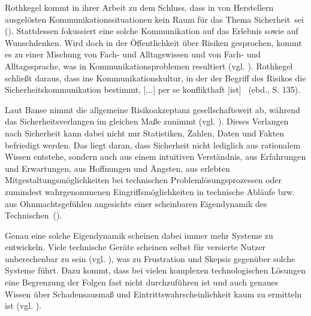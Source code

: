 Rothkegel kommt in ihrer Arbeit zu dem Schluss, dass in von Herstellern ausgelösten Kommunikationssituationen \glqq kein Raum für das Thema Sicherheit\grqq \, sei (\cite[132]{rothkegel2013sicherheitskommunikation}). Stattdessen fokussiert eine solche Kommunikation auf das Erlebnis sowie auf Wunschdenken. Wird doch in der Öffentlichkeit über Risiken gesprochen, kommt es zu einer Mischung von Fach- und Alltagswissen und von Fach- und Alltagssprache, was in Kommunikationsproblemen resultiert (vgl. \cite[134]{rothkegel2013sicherheitskommunikation}). Rothkegel schließt daraus, dass \glqq [e]ine Kommunikationskultur, in der der Begriff des Risikos die Sicherheitskommunikation bestimmt, [...] per se konflikthaft [ist] \grqq \, (ebd., S. 135).

Laut Banse nimmt die allgemeine Risikoakzeptanz gesellschaftsweit ab, während das Sicherheitsverlangen im gleichen Maße zunimmt (vgl. \cite[3]{banse2018technik}). Dieses Verlangen nach Sicherheit kann dabei nicht nur Statistiken, Zahlen, Daten und Fakten befriedigt werden. Das liegt daran, dass Sicherheit nicht lediglich aus rationalem Wissen entstehe, sondern auch aus \glqq einem intuitiven Verständnis, aus Erfahrungen und Erwartungen, aus Hoffnungen und Ängsten, aus erlebten Mitgestaltungsmöglichkeiten bei technischen Problemlösungsprozessen oder zumindest wahrgenommenen Eingriffsmöglichkeiten in technische Abläufe bzw. aus Ohnmachtsgefühlen angesichts einer scheinbaren Eigendynamik des Technischen\grqq \, (\cite[4]{banse2018technik}).

Genau eine solche Eigendynamik scheinen dabei immer mehr Systeme zu entwickeln. Viele technische Geräte scheinen selbst für versierte Nutzer unberechenbar zu sein (vgl. \cite[5]{norman2013design}), was zu Frustration und Skepsis gegenüber solche Systeme führt. Dazu kommt, dass bei vielen komplexen technologischen Lösungen eine Begrenzung der Folgen fast nicht durchzuführen ist und auch genaues Wissen über Schadensausmaß und Eintrittswahrscheinlichkeit kaum zu ermitteln ist (vgl. \cite[12]{banse2018technik}).

